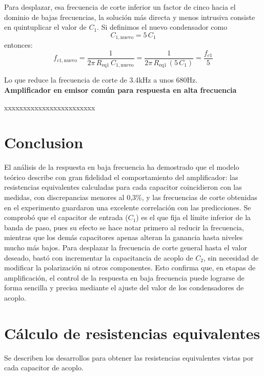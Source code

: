 \documentclass[journal]{IEEEtran}
\begin{document}
\par Para desplazar, esa frecuencia de corte inferior un factor de cinco hacia el dominio de bajas frecuencias, la solución más directa y menos intrusiva consiste en quintuplicar el valor de \(C_1\). Si definimos el nuevo condensador como \[C_{1,\mathrm{nuevo}} = 5\,C_1\] entonces: 
\begin{equation}
f_{c1,\mathrm{nuevo}}
= \frac{1}{2\pi\,R_{\mathrm{eq1}}\,C_{1,\mathrm{nuevo}}}
= \frac{1}{2\pi\,R_{\mathrm{eq1}}\,(5\,C_1)}
= \frac{f_{c1}}{5}
\end{equation}
\par Lo que reduce la frecuencia de corte de 3.4kHz a unos 680Hz. 
\newline
\\
\textbf{Amplificador en emisor común para respuesta en alta frecuencia}
\par xxxxxxxxxxxxxxxxxxxxxxxx

\section{Conclusion}
\par El análisis de la respuesta en baja frecuencia ha demostrado que el modelo teórico describe con gran fidelidad el comportamiento del amplificador: las resistencias equivalentes calculadas para cada capacitor coincidieron con las medidas, con discrepancias menores al 0,3\%, y las frecuencias de corte obtenidas en el experimento guardaron una excelente correlación con las predicciones. Se comprobó que el capacitor de entrada (\(C_1\)) es el que fija el límite inferior de la banda de paso, pues su efecto se hace notar primero al reducir la frecuencia, mientras que los demás capacitores apenas alteran la ganancia hasta niveles mucho más bajos. Para desplazar la frecuencia de corte general hasta el valor deseado, bastó con incrementar la capacitancia de acoplo de \(C_2\), sin necesidad de modificar la polarización ni otros componentes. Esto confirma que, en etapas de amplificación, el control de la respuesta en baja frecuencia puede lograrse de forma sencilla y precisa mediante el ajuste del valor de los condensadores de acoplo.


\appendices
\section{}
\section*{Cálculo de resistencias equivalentes}
\par Se describen los desarrollos para obtener las resistencias equivalentes vistas por cada capacitor de acoplo.
\end{document}
